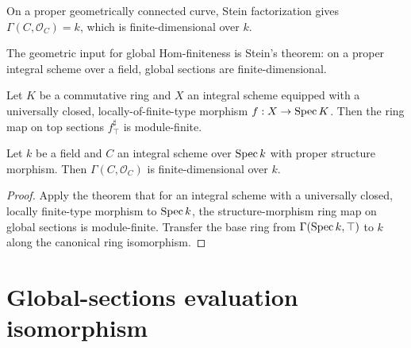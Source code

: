 \begin{remark}
  On a proper geometrically connected curve, Stein factorization gives \(\Gamma(C, \mathcal O_C) = k\), which is finite-dimensional over \(k\).
\end{remark}


The geometric input for global Hom-finiteness is Stein's theorem: on a proper integral scheme over a field, global sections are finite-dimensional.

\begin{theorem}
  \label{mk-thm:finite_appTop_of_universallyClosed}
  \mathlibok


  Let \(K\) be a commutative ring and \(X\) an integral scheme equipped with a
  universally closed, locally-of-finite-type morphism \(f : X \to \operatorname{Spec} K\).
  Then the ring map on top sections \(f^\sharp_{\top}\) is module-finite.

\end{theorem}

\begin{theorem}\label{mk-thm:Scheme_module_finite_globalSections_of_isProper}
  \leanok


  Let \(k\) be a field and \(C\) an integral scheme over \(\operatorname{Spec} k\) with proper structure morphism. Then \(\Gamma(C, \mathcal O_C)\) is finite-dimensional over \(k\).
\end{theorem}

\begin{proof}
  \leanok

  Apply the theorem that for an integral scheme with a universally closed, locally finite-type morphism to \(\operatorname{Spec} k\), the structure-morphism ring map on global sections is module-finite. Transfer the base ring from \(\Gamma(\operatorname{Spec} k, \top)\) to \(k\) along the canonical ring isomorphism.
\end{proof}

\section{Global-sections evaluation isomorphism}
\label{mk-sec:gammaObj_linearEquiv_top}

